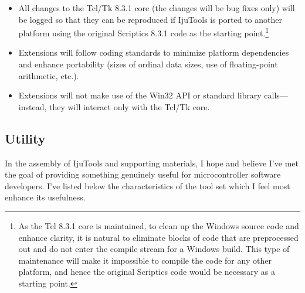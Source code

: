\begin{itemize}

\item All changes to the Tcl/Tk 8.3.1 core (the changes will be bug fixes
      only) will be logged so that they can be
      reproduced if IjuTools is ported to another platform using 
      the original Scriptics 8.3.1 code as the starting
      point.\footnote{As the Tcl 8.3.1 core is maintained, 
      to clean up the Windows source code and enhance clarity, it is natural
      to eliminate blocks of code that are preprocessed out and do not
      enter the compile stream for a Windows build.  This type of maintenance
      will make it impossible to compile the code for any other platform,
      and hence the original Scriptics code would be necessary as a starting
      point.}

\item Extensions will follow coding standards to minimize platform dependencies
      and enhance portability
      (sizes of ordinal data sizes, use of floating-point arithmetic, etc.).

\item Extensions will not make use of the Win32 API or standard library
      calls---instead, they will interact only with the Tcl/Tk core.

\end{itemize}


\subsection{Utility}

In the assembly of IjuTools and supporting materials, I hope and believe 
I've met the goal of providing something genuinely useful for microcontroller
software developers. I've listed below the characteristics of the tool set
which I feel most enhance its usefulness.

